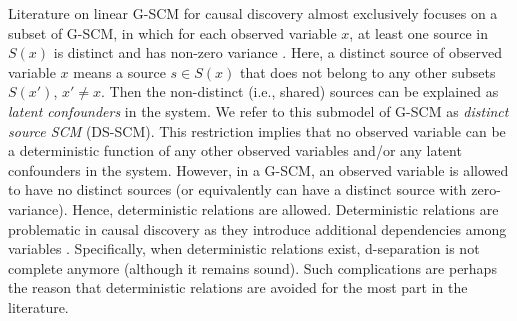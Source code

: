 \documentclass[12pt]{article}
\begin{document}
Literature on linear G-SCM for causal discovery almost exclusively focuses on a subset of G-SCM, in which for each observed variable $x$, at least one source in $S(x)$ is distinct and has non-zero variance \citep{peters2017elements}. Here, a distinct source of observed variable $x$ means a source $s\in S(x)$ that does not belong to any other subsets $S(x')$, $x'\neq x$. %
Then the non-distinct (i.e., shared) sources can be explained as {\it{latent confounders}} in the system.
We refer to this submodel of G-SCM as \emph{distinct source SCM} (DS-SCM). This restriction implies that no observed variable can be a deterministic function of any other observed variables and/or any latent confounders in the system. %
However, in a G-SCM, an observed variable is allowed to have no distinct sources  (or equivalently can have a distinct source with zero-variance). Hence, deterministic relations are allowed. Deterministic relations are problematic in causal discovery as they introduce additional dependencies among variables \citep{peters2017elements}. Specifically, when deterministic relations exist, d-separation is not complete anymore (although it remains sound). Such complications are perhaps the reason that deterministic relations are avoided for the most part in the literature.

\end{document}
